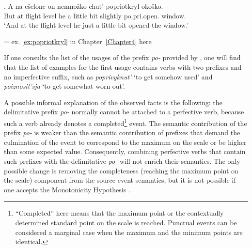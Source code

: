\exg. \label{ex:popriotkryl:rep}A na e\v{s}elone on nemno\v{z}ko chut' popriotkryl oko\v{s}ko.\\
But at {flight level} he {a little bit} {slightly} po.pri.open. window.\\
\vspace{0.5em}
`And at the flight level he just a little bit opened the window.'
\begin{flushright}
\vspace{-1em}
= ex. \ref{ex:popriotkryl} in Chapter~\ref{Chapter4} here
\end{flushright}

If one consults the list of the usages of the prefix \textit{po-} provided by \citet{Shvedova:82}, one will find that the list of examples for the first usage contains verbs with two prefixes and no imperfective suffix, such as \textit{poprivyknut'} `to get somehow used' and \textit{poiznosit'sja} `to get somewhat worn out'. 


A possible informal explanation of the observed facts is the following: the delimitative prefix \textit{po-} normally cannot be attached to a perfective verb, because such a verb already denotes a completed\footnote{``Completed'' here means that the maximum point or the contextually determined standard point on the scale is reached. Punctual events can be considered a marginal case when the maximum and the minimum points are identical.} event. The semantic contribution of the prefix \textit{po-} is weaker than the semantic contribution of prefixes that demand the culmination of the event to correspond to the maximum on the scale or be higher than some expected value. Consequently, combining perfective verbs that contain such prefixes with the delimitative \textit{po-} will not enrich their semantics. The only possible change is removing the completeness (reaching the maximum point on the scale) component from the source event semantics, but it is not possible if one accepts the Monotonicity Hypothesis \citep{Kiparsky:82}.

